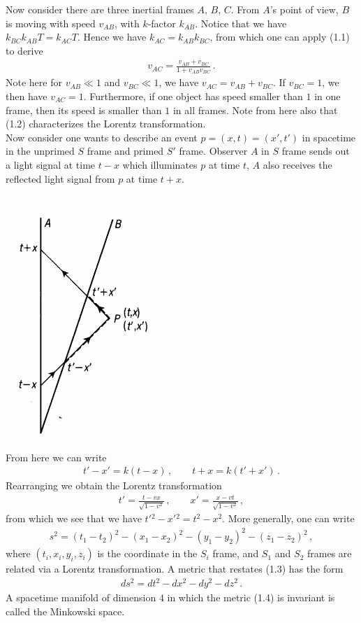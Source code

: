 \documentclass[11pt, onesided]{book}
\theoremstyle{break}
\theoremstyle{break}
\begin{document}
Now consider there are three inertial frames $A,\,B,\,C$. From $A$'s point of view, $B$ is moving with speed $v_{AB}$, with $k$-factor $k_{AB}$. Notice that we have $k_{BC} k_{AB}T = k_{AC}T$. Hence we have $k_{AC} = k_{AB} k_{BC}$, from which one can apply (1.1) to derive 
\begin{align}
v_{AC} = \frac{v_{AB}+v_{BC}}{1+v_{AB}v_{BC}}\,.
\end{align}
Note here for $v_{AB}\ll 1$ and $v_{BC}\ll 1$, we have $v_{AC} = v_{AB} + v_{BC}$. If $v_{BC} = 1$, we then have $v_{AC} =1$. Furthermore, if one object has speed smaller than $1$ in one frame, then its speed is smaller than $1$ in all frames. Note from here also that (1.2) characterizes the Lorentz transformation. \\

Now consider one wants to describe an event $p=(x,t) = (x',t')$ in spacetime in the unprimed $S$ frame and primed $S'$ frame. Observer $A$ in $S$ frame sends out a light signal at time $t - x$ which illuminates $p$ at time $t$, $A$ also receives the reflected light signal from $p$ at time $t+x$. 
\begin{center}
\includegraphics[scale=0.9]{LT.png}
\end{center}
From here we can write
\begin{align*}
t'-x' = k(t-x) \,,\qquad t+x = k(t'+x')\,.
\end{align*}
Rearranging we obtain the Lorentz transformation
\begin{align*}
t' = \frac{t-vx}{\sqrt{1-v^2}}\,,\qquad x' = \frac{x - vt}{\sqrt{1-v^2}}\,,
\end{align*}
from which we see that we have $t'{}^2 - x'{}^2 = t^2 - x^2$. More generally, one can write
\begin{align}
s^2 = (t_1-t_2)^2 - (x_1 - x_2)^2 - (y_1 - y_2)^2 -(z_1-z_2)^2\,,
\end{align}
where $(t_i,x_i,y_i,z_i)$ is the coordinate in the $S_i$ frame, and $S_1$ and $S_2$ frames are related via a Lorentz transformation. A metric that restates (1.3) has the form
\begin{align}
ds^2 = dt^2 - dx^2 - dy^2 - dz^2\,.
\end{align}
A spacetime manifold of dimension $4$ in which the metric (1.4) is invariant is called the Minkowski space. \\
\end{document}
